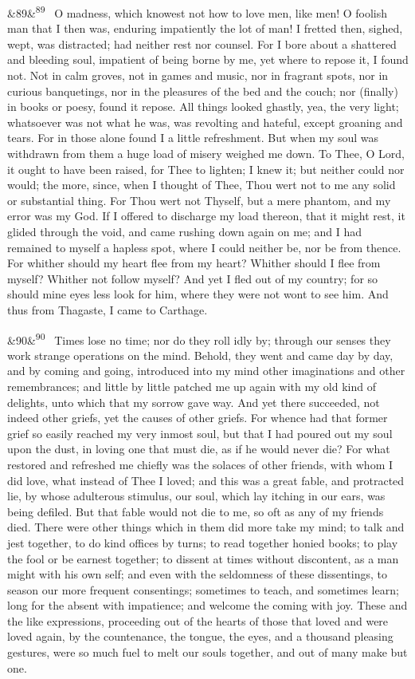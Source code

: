 \documentclass[12pt]{article}
\newcommand{\para}[1][]{\par\noindent\ifx&#1&\else\textsuperscript{\footnotesize #1}~\fi}
\begin{document}
\para[89] O madness, which knowest not how to love men, like men! O foolish man that I then was, enduring impatiently the lot of man! I fretted then, sighed, wept, was distracted; had neither rest nor counsel. For I bore about a shattered and bleeding soul, impatient of being borne by me, yet where to repose it, I found not. Not in calm groves, not in games and music, nor in fragrant spots, nor in curious banquetings, nor in the pleasures of the bed and the couch; nor (finally) in books or poesy, found it repose. All things looked ghastly, yea, the very light; whatsoever was not what he was, was revolting and hateful, except groaning and tears. For in those alone found I a little refreshment. But when my soul was withdrawn from them a huge load of misery weighed me down. To Thee, O Lord, it ought to have been raised, for Thee to lighten; I knew it; but neither could nor would; the more, since, when I thought of Thee, Thou wert not to me any solid or substantial thing. For Thou wert not Thyself, but a mere phantom, and my error was my God. If I offered to discharge my load thereon, that it might rest, it glided through the void, and came rushing down again on me; and I had remained to myself a hapless spot, where I could neither be, nor be from thence. For whither should my heart flee from my heart? Whither should I flee from myself? Whither not follow myself? And yet I fled out of my country; for so should mine eyes less look for him, where they were not wont to see him. And thus from Thagaste, I came to Carthage.

\para[90] Times lose no time; nor do they roll idly by; through our senses they work strange operations on the mind. Behold, they went and came day by day, and by coming and going, introduced into my mind other imaginations and other remembrances; and little by little patched me up again with my old kind of delights, unto which that my sorrow gave way. And yet there succeeded, not indeed other griefs, yet the causes of other griefs. For whence had that former grief so easily reached my very inmost soul, but that I had poured out my soul upon the dust, in loving one that must die, as if he would never die? For what restored and refreshed me chiefly was the solaces of other friends, with whom I did love, what instead of Thee I loved; and this was a great fable, and protracted lie, by whose adulterous stimulus, our soul, which lay itching in our ears, was being defiled. But that fable would not die to me, so oft as any of my friends died. There were other things which in them did more take my mind; to talk and jest together, to do kind offices by turns; to read together honied books; to play the fool or be earnest together; to dissent at times without discontent, as a man might with his own self; and even with the seldomness of these dissentings, to season our more frequent consentings; sometimes to teach, and sometimes learn; long for the absent with impatience; and welcome the coming with joy. These and the like expressions, proceeding out of the hearts of those that loved and were loved again, by the countenance, the tongue, the eyes, and a thousand pleasing gestures, were so much fuel to melt our souls together, and out of many make but one.
\end{document}
